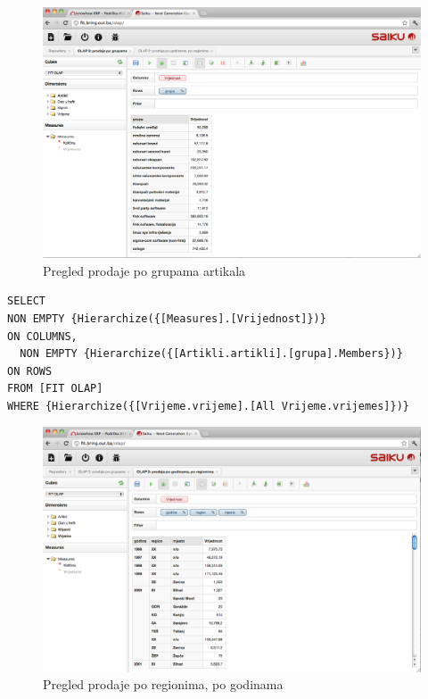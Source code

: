 \documentclass[times, utf8, seminar]{fit}
\begin{document}
\begin{figure}[H]
\centering
\includegraphics[width=15cm]{img/saiku_rpt_grupe}
\caption{Pregled prodaje po grupama artikala}
\end{figure}

\begin{lstlisting}
SELECT
NON EMPTY {Hierarchize({[Measures].[Vrijednost]})} 
ON COLUMNS,
  NON EMPTY {Hierarchize({[Artikli.artikli].[grupa].Members})} 
ON ROWS
FROM [FIT OLAP]
WHERE {Hierarchize({[Vrijeme.vrijeme].[All Vrijeme.vrijemes]})}
\end{lstlisting}


\begin{figure}[H]
\centering
\includegraphics[width=15cm]{img/saiku_rpt_region}
\caption{Pregled prodaje po regionima, po godinama}
\end{figure}
\end{document}
